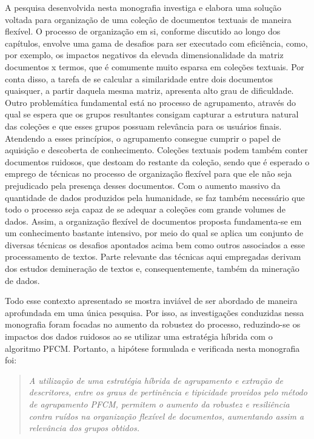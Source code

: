 A pesquisa desenvolvida nesta monografia investiga e elabora uma solução voltada para organização
de uma coleção de documentos textuais de maneira flexível. O processo de organização em si, conforme 
discutido ao longo dos capítulos, envolve uma gama de desafios para ser executado com eficiência, como, 
por exemplo, os impactos negativos da elevada dimensionalidade da matriz documentos x termos, que 
é comumente muito esparsa em coleções textuais. Por conta disso, a tarefa de se calcular a similaridade
entre dois documentos quaisquer, a partir daquela mesma matriz, apresenta alto grau de dificuldade. 
Outro problemática fundamental está no processo de agrupamento, através do qual se espera que os grupos resultantes 
consigam capturar a estrutura natural das coleções e que esses grupos possuam relevância para os usuários finais. 
Atendendo a esses princípios, o agrupamento consegue cumprir o papel de aquisição e descoberta de conhecimento. Coleções textuais podem também 
conter documentos ruidosos, que destoam do restante da coleção, sendo que é esperado o emprego de técnicas no processo de organização
flexível para que ele não seja prejudicado pela presença desses documentos. Com o aumento massivo da
quantidade de dados produzidos pela humanidade, se faz também necessário que todo o processo seja
capaz de se adequar a coleções com grande volumes de dados. Assim, a organização flexível de documentos proposta fundamenta-se em um conhecimento 
bastante intensivo, por meio do qual se aplica um conjunto de diversas técnicas os desafios apontados acima bem como outros associados a 
esse processamento de textos. Parte relevante das técnicas aqui empregadas derivam dos estudos demineração de textos e, consequentemente, 
também da mineração de dados. 

Todo esse contexto apresentado se mostra inviável de ser abordado de maneira aprofundada em uma única
pesquisa. Por isso, as investigações conduzidas nessa monografia foram focadas no aumento da
robustez do processo, reduzindo-se os impactos dos dados ruidosos ao se utilizar uma estratégia
híbrida com o algoritmo PFCM. Portanto, a hipótese formulada e verificada nesta monografia foi:

\begin{quote}
\textit{A utilização de uma estratégia híbrida de agrupamento e extração de descritores, entre os 
  graus de pertinência e tipicidade providos pelo método de agrupamento PFCM, permitem o aumento da
    robustez e resiliência contra ruídos na organização flexível de documentos, aumentando assim a
    relevância dos grupos obtidos.}
\end{quote}

